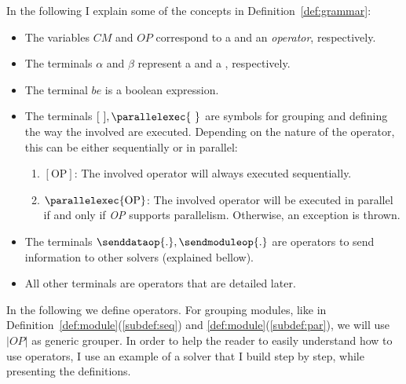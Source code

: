 In the following I explain some of the concepts in Definition~\ref{def:grammar}: 
\begin{itemize}
	\item The variables $CM$ and $OP$ correspond to a \cm{} and an {\it operator}, respectively.
	\item The terminals $\alpha$ and $\beta$ represent a \om{} and a \opch{}, respectively.
	\item The terminal $be$ is a boolean expression.
	\item The terminals $[\text{ } ], \parallelexec{\text{ }}$ are symbols for grouping and defining the way the involved \cms{} are executed. Depending on the nature of the operator, this can be either sequentially or in parallel:
	\begin{enumerate}\renewcommand{\labelitemi}{\scriptsize$\blacksquare$}
		\item $\left[\text{OP}\right]$: The involved operator will always executed sequentially.
		\item $\parallelexec{\text{OP}}$: The involved operator will be executed in parallel if and only if \emph{OP} supports parallelism. Otherwise, an exception is thrown.
	\end{enumerate}
	\item The terminals $\senddataop{.}, \sendmoduleop{.}$ are operators to send information to other solvers (explained bellow).
	\item All other terminals are \posl{} operators that are detailed later.
\end{itemize}

In the following we define \posl{} operators. For grouping modules, like in Definition~\ref{def:module}(\ref{subdef:seq}) and \ref{def:module}(\ref{subdef:par}), we will use $\left|OP\right|$ as generic grouper. In order to help the reader to easily understand how to use operators, I use an example of a solver that I build step by step, while presenting the definitions.


